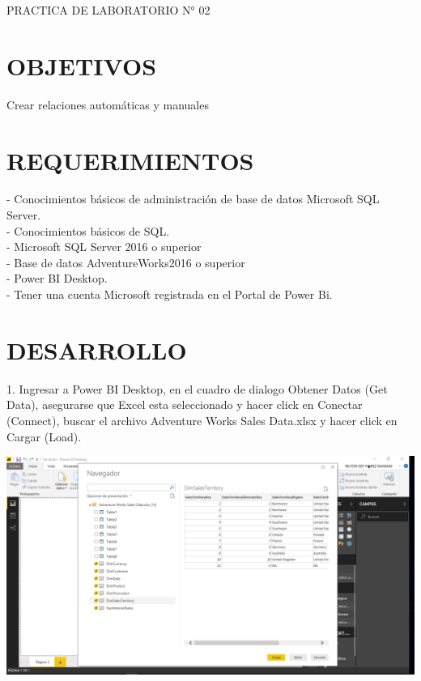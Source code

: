 \begin{center}
    PRACTICA DE LABORATORIO N° 02
\end{center}

\section{OBJETIVOS}
Crear relaciones automáticas y manuales

\section{REQUERIMIENTOS}

\begin{itemize}

- Conocimientos básicos de administración de base de datos Microsoft   SQL Server.
\\- Conocimientos básicos de SQL.
\\- Microsoft SQL Server 2016 o superior
\\- Base de datos AdventureWorks2016 o superior
\\- Power BI Desktop.
\\- Tener una cuenta Microsoft registrada en el Portal de Power Bi.
\end{itemize}

\section{DESARROLLO} 

\begin{itemize}
1. Ingresar a Power BI Desktop, en el cuadro de dialogo Obtener Datos (Get Data), asegurarse que Excel esta seleccionado y hacer click en Conectar (Connect), buscar el archivo Adventure Works Sales Data.xlsx y hacer click en Cargar (Load).

\end{itemize} 

\begin{center}
\includegraphics[width=15cm]{./Imagenes/img1} 
\end{center}

